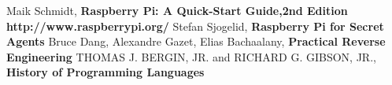\documentclass[11pt, oneside]{Thesis} %
\begin{document}

\appendix %



%
%


\backmatter


\begin{thebibliography}{999}
Maik Schmidt, \textbf{Raspberry Pi: A Quick-Start Guide,2nd Edition}
\textbf{http://www.raspberrypi.org/}
Stefan Sjogelid, \textbf{Raspberry Pi for Secret Agents}
Bruce Dang, Alexandre Gazet, Elias Bachaalany, \textbf{Practical Reverse Engineering}
THOMAS J. BERGIN, JR. and RICHARD G. GIBSON, JR., \textbf{History of Programming Languages}
\end{thebibliography}
\end{document}
